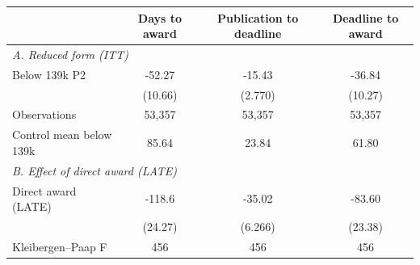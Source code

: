 \begin{tabular}{l*{3}{c}}
\toprule
            &\multicolumn{1}{c}{Days to award}&\multicolumn{1}{c}{Publication to deadline}&\multicolumn{1}{c}{Deadline to award}\\
\midrule
\multicolumn{4}{l}{\textit{A. Reduced form (ITT)}}\\
Below 139k \texttimes{} P2&      -52.27\sym{***}&      -15.43\sym{***}&      -36.84\sym{***}\\
            &     (10.66)         &     (2.770)         &     (10.27)         \\
\addlinespace
Observations&      53,357         &      53,357         &      53,357         \\
Control mean below 139k&       85.64         &       23.84         &       61.80         \\
\midrule
\multicolumn{4}{l}{\textit{B. Effect of direct award (LATE)}}\\
\addlinespace[1pt]
Direct award (LATE)&      -118.6\sym{***}&      -35.02\sym{***}&      -83.60\sym{***}\\
            &     (24.27)         &     (6.266)         &     (23.38)         \\
\addlinespace
Kleibergen--Paap F&         456         &         456         &         456         \\
\bottomrule
\end{tabular}
